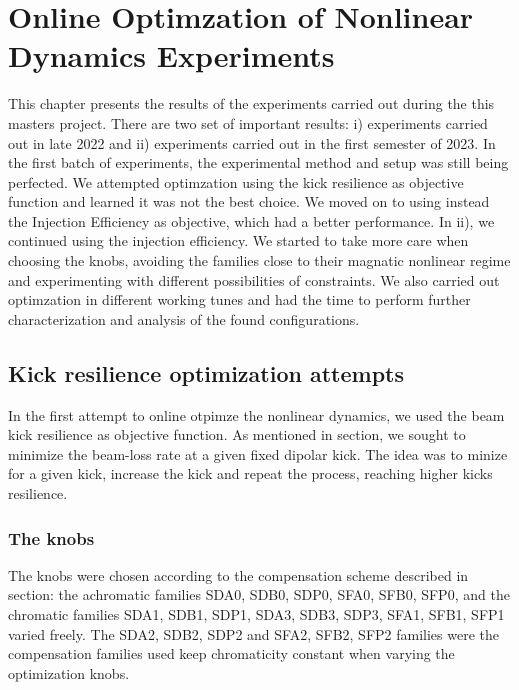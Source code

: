 \chapter{Online Optimzation of Nonlinear Dynamics Experiments}
This chapter presents the results of the experiments carried out during the this masters project. There are two set of important results: i) experiments carried out in late 2022 and ii) experiments carried out in the first semester of 2023. In the first batch of experiments, the experimental method and setup was still being perfected. We attempted optimzation using the kick resilience as objective function and learned it was not the best choice. We moved on to using instead the Injection Efficiency as objective, which had a better performance.  In ii), we continued using the injection efficiency. We started to take more care when choosing the knobs, avoiding the families close to their magnatic nonlinear regime and experimenting with different possibilities of constraints. We also carried out optimzation in different working tunes and had the time to perform further characterization and analysis of the found configurations.
\section{Kick resilience optimization attempts}
\label{experiments22}
In the first attempt to online otpimze the nonlinear dynamics, we used the beam kick resilience as objective function. As mentioned in section, we sought to minimize the beam-loss rate at a given fixed dipolar kick. The idea was to minize for a given kick, increase the kick and repeat the process, reaching higher kicks resilience.
\subsection{The knobs}
The knobs were chosen according to the compensation scheme described in section: the achromatic families SDA0, SDB0, SDP0, SFA0, SFB0, SFP0, and the chromatic families SDA1, SDB1, SDP1, SDA3, SDB3, SDP3, SFA1, SFB1, SFP1 varied freely. The SDA2, SDB2, SDP2 and SFA2, SFB2, SFP2 families were the compensation families used keep chromaticity constant when varying the optimization knobs.
